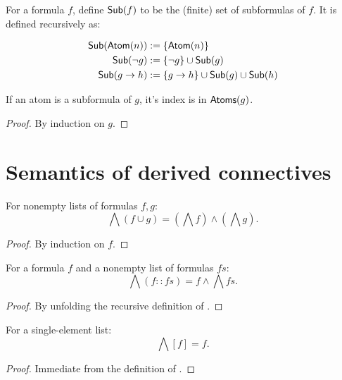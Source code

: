 \begin{definition}
    \label{Sub}
    \leanok
    For a formula $f$, define $\mathsf{Sub}(f)$ to be the (finite) set of subformulas of $f$.
    It is defined recursively as:

    \[
    \begin{align}
        \mathsf{Sub}(\mathsf{Atom}(n)) &:= \{\mathsf{Atom}(n)\} \\
        \mathsf{Sub}(\neg g) &:= \{\neg g\} \cup \mathsf{Sub}(g) \\
        \mathsf{Sub}(g \to h) &:= \{g \to h\} \cup \mathsf{Sub}(g) \cup \mathsf{Sub}(h) \\
    \end{align}
    \]
\end{definition}

\begin{lemma}
    \label{mem_atoms_of_subformula}
    \leanok
    If an atom is a subformula of $g$, it's index is in $\mathsf{Atoms}(g)$.
\end{lemma}
\begin{proof}
    \leanok
    By induction on $g$.
\end{proof}

\section{Semantics of derived connectives}

\begin{lemma}
    \label{BigAnd.append}
    For nonempty lists of formulas $f, g$:
    \[
    \bigwedge (f \cup g) = \left(\bigwedge f\right) \wedge \left(\bigwedge g\right).
    \]
\end{lemma}
\begin{proof}
    By induction on $f$.
\end{proof}

\begin{lemma}
    \label{BigAnd.cons}
    For a formula $f$ and a nonempty list of formulas $fs$:
    \[
    \bigwedge (f :: fs) = f \wedge \bigwedge fs.
    \]
\end{lemma}
\begin{proof}
    By unfolding the recursive definition of \BigAnd.
\end{proof}

\begin{lemma}
    \label{BigAnd.single}
    For a single-element list:
    \[
    \bigwedge [f] = f.
    \]
\end{lemma}
\begin{proof}
    Immediate from the definition of \BigAnd.
\end{proof}

